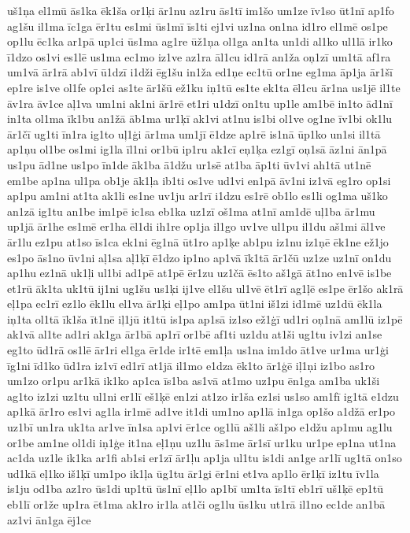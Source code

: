 {uš1ņa
el1mū
ās1ka
ēk1ša
or1ķi
ār1nu
az1ru
ās1tī
im1šo
um1ze
īv1so
ūt1nī
ap1fo
ag1šu
il1ma
īc1ga
ēr1tu
es1mi
ūs1mī
īs1ti
ej1vi
uz1na
on1na
id1ro
el1mē
os1pe
op1lu
ēc1ka
ar1pā
up1ci
ūs1ma
ag1re
ūž1ņa
ol1ga
an1ta
un1di
al1ko
ul1lā
ir1ko
ī1dzo
os1vi
es1lē
us1ma
ec1mo
iz1ve
az1ra
āl1cu
id1rā
an1ža
oņ1zī
um1tā
af1ra
um1vā
ār1rā
ab1vī
ū1dzī
i1dži
ēg1šu
in1ža
ed1ņe
ec1tū
or1ne
eg1ma
āp1ja
ār1šī
ep1re
is1ve
ol1fe
op1ci
as1te
ār1šū
ež1ku
iņ1tū
es1te
ek1ta
ēl1cu
ār1na
us1jē
il1te
āv1ra
āv1ce
aļ1va
um1ni
ak1ni
ār1rē
et1ri
u1dzī
on1tu
up1le
am1bē
in1to
ād1nī
in1ta
ol1ma
īk1bu
an1žā
āb1ma
ur1ķī
ak1vi
at1nu
is1bi
ol1ve
og1ne
īv1bi
ok1lu
ār1čī
ug1ti
īn1ra
ig1to
uļ1ģi
ār1ma
um1jī
ē1dze
ap1rē
is1nā
ūp1ko
un1si
il1tā
ap1ņu
ol1be
os1mi
ig1la
īl1ni
or1bū
ip1ru
ak1cī
eņ1ķa
ez1gī
oņ1sā
āz1ni
ān1pā
us1pu
ād1ne
us1po
īn1de
āk1ba
ā1džu
ur1sē
at1ba
āp1ti
ūv1vi
ah1tā
ut1nē
em1be
ap1na
ul1pa
ob1je
āk1ļa
ib1ti
os1ve
ud1vi
en1pā
āv1ni
iz1vā
eg1ro
op1si
ap1pu
am1ni
at1ta
ak1li
es1ne
uv1ju
ar1rī
i1dzu
es1rē
ob1lo
es1li
og1ma
uš1ko
an1zā
ig1tu
an1be
im1pē
ic1sa
eb1ka
uz1zī
oš1ma
at1nī
am1dē
uļ1ba
ār1mu
up1jā
ār1he
es1mē
er1ha
ēl1di
ih1re
op1ja
il1go
uv1ve
ul1pu
il1du
aš1mi
āl1ve
ār1lu
ez1pu
at1so
īs1ca
ek1ni
ēg1nā
ūt1ro
ap1ķe
ab1pu
iz1nu
iz1ņē
ēk1ne
ež1jo
es1po
ās1no
ūv1ni
aļ1sa
aļ1ķī
ē1dzo
ip1no
ap1vā
īk1tā
ār1čū
uz1ze
uz1nī
on1du
ap1hu
ez1nā
uk1ļi
ul1bi
ad1pē
at1pē
ēr1zu
uz1čā
ēs1to
aš1gā
āt1no
en1vē
is1be
et1rū
āk1ta
uk1tū
ij1ni
ug1šu
us1ķi
ij1ve
el1šu
ul1vē
ēt1rī
ag1ļē
es1pe
ēr1šo
ak1rā
eļ1pa
ec1rī
ez1lo
ēk1lu
el1va
ār1ķi
eļ1po
am1pa
ūt1ni
iš1zi
id1mē
uz1dū
ēk1la
iņ1ta
ol1tā
īk1ša
īt1nē
iļ1jū
it1tū
is1pa
ap1sā
iz1so
ež1ģī
ud1ri
oņ1nā
am1lū
iz1pē
ak1vā
al1te
ad1ri
ak1ga
ār1bā
ap1rī
or1bē
af1ti
uz1du
at1ši
ug1tu
iv1zi
an1se
eg1to
ūd1rā
os1lē
ār1ri
el1ga
ēr1de
ir1tē
em1ļa
us1na
im1do
āt1ve
ur1ma
ur1ģi
īg1ni
īd1ko
ūd1ra
iz1vī
ed1rī
at1jā
il1mo
e1dza
ēk1to
ār1ģē
iļ1ņi
iz1bo
as1ro
um1zo
or1pu
ar1kā
ik1ko
ap1ca
īs1ba
as1vā
at1mo
uz1pu
ēn1ga
am1ba
uk1ši
ag1to
iz1zi
uz1tu
ul1ni
er1lī
eš1ķē
en1zi
at1zo
ir1ša
ez1si
us1so
am1fī
ig1tā
e1dzu
ap1kā
ār1ro
es1vi
ag1la
ir1mē
ad1ve
it1di
um1no
ap1lā
in1ga
op1šo
a1džā
er1po
uz1bī
un1ra
uk1ta
ar1ve
īn1sa
ap1vi
ēr1ce
og1lū
aš1li
aš1po
e1džu
ap1mu
ag1lu
or1be
am1ne
ol1di
iņ1ģe
it1na
eļ1ņu
uz1lu
ās1me
ār1sī
ur1ku
ur1pe
ep1na
ut1na
ac1da
uz1le
ik1ka
ar1fi
ab1si
er1zī
ār1ļu
ap1ja
ul1tu
is1di
an1ge
ar1lī
ug1tā
on1so
ud1kā
eļ1ko
iš1ķī
um1po
ik1ļa
ūg1tu
ār1gi
ēr1ni
et1va
ap1lo
ēr1ķī
iz1tu
īv1la
is1ju
od1ba
az1ro
ūs1di
up1tū
ūs1nī
eļ1lo
ap1bī
um1ta
īs1tī
eb1rī
uš1ķē
ep1tū
eb1lī
or1že
up1ra
ēt1ma
ak1ro
ir1la
at1či
og1lu
ūs1ku
ut1rā
il1no
ec1de
an1bā
az1vi
ān1ga
ēj1ce
}
